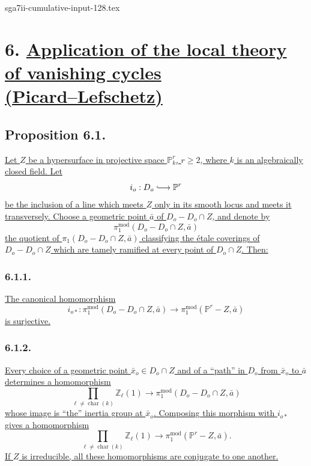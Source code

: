 \begin{filecontents*}{sga7ii-cumulative-input-128.tex}
\section*{6. \underline{Application of the local theory of vanishing cycles}\\
\underline{(Picard--Lefschetz)}}

\subsection*{Proposition 6.1.}
\underline{Let $Z$ be a hypersurface in projective space $\mathbb P^r_k$,
$r\geq2$, where $k$ is an algebraically closed field.  Let}
\[
i_o:D_o\lhook\joinrel\longrightarrow\mathbb P^r
\]
\underline{be the inclusion of a line which meets $Z$ only in its smooth
locus and meets it transversely.  Choose a geometric point $\bar a$ of
$D_o-D_o\cap Z$, and denote by}
\[
\pi_1^{\mathrm{mod}}(D_o-D_o\cap Z,\bar a)
\]
\underline{the quotient of $\pi_1(D_o-D_o\cap Z,\bar a)$ classifying the
étale coverings of $D_o-D_o\cap Z$ which are tamely ramified at every point
of $D_o\cap Z$.  Then:}

\subsubsection*{6.1.1.}
\underline{The canonical homomorphism}
\begin{equation}\tag{6.1.1.1}
i_{o*}:\pi_1^{\mathrm{mod}}(D_o-D_o\cap Z,\bar a)
\longrightarrow
\pi_1^{\mathrm{mod}}(\mathbb P^r-Z,\bar a)
\end{equation}
\underline{is surjective.}

\subsubsection*{6.1.2.}
\underline{Every choice of a geometric point $\bar x_o\in D_o\cap Z$ and
of a ``path'' in $D_o$ from $\bar x_o$ to $\bar a$ determines a
homomorphism}
\begin{equation}\tag{6.1.2.1}
\prod_{\ell\ne\operatorname{char}(k)}\mathbb Z_\ell(1)
\longrightarrow
\pi_1^{\mathrm{mod}}(D_o-D_o\cap Z,\bar a)
\end{equation}
\underline{whose image is ``the'' inertia group at $\bar x_o$.  Composing
this morphism with $i_{o*}$ gives a homomorphism}
\begin{equation}\tag{6.1.2.2}
\prod_{\ell\ne\operatorname{char}(k)}\mathbb Z_\ell(1)
\longrightarrow
\pi_1^{\mathrm{mod}}(\mathbb P^r-Z,\bar a).
\end{equation}
\underline{If $Z$ is irreducible, all these homomorphisms are conjugate to
one another.}


\end{filecontents*}
